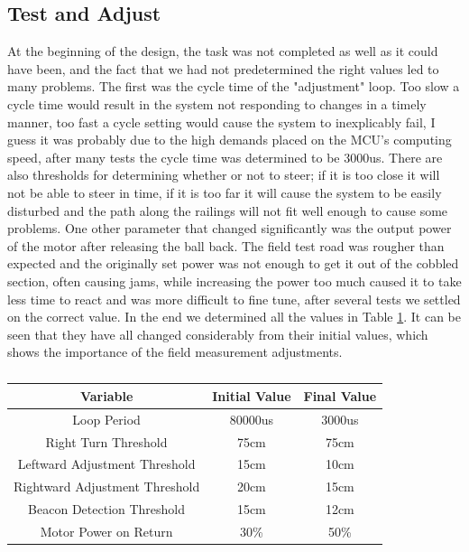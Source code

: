 \documentclass[12pt, a4paper, oneside]{report}
\begin{document}
\subsection{Test and Adjust}
At the beginning of the design, the task was not completed as well as it could have been, and the fact that we had not predetermined the right values led to many problems. The first was the cycle time of the "adjustment" loop. Too slow a cycle time would result in the system not responding to changes in a timely manner, too fast a cycle setting would cause the system to inexplicably fail, I guess it was probably due to the high demands placed on the MCU's computing speed, after many tests the cycle time was determined to be 3000us. There are also thresholds for determining whether or not to steer; if it is too close it will not be able to steer in time, if it is too far it will cause the system to be easily disturbed and the path along the railings will not fit well enough to cause some problems. One other parameter that changed significantly was the output power of the motor after releasing the ball back. The field test road was rougher than expected and the originally set power was not enough to get it out of the cobbled section, often causing jams, while increasing the power too much caused it to take less time to react and was more difficult to fine tune, after several tests we settled on the correct value. In the end we determined all the values in Table \ref{table:patio2}. It can be seen that they have all changed considerably from their initial values, which shows the importance of the field measurement adjustments.
\begin{table}[H]
    \centering
    \begin{tabular}{|c|c|c|}
        \hline
        Variable  & Initial Value & Final Value  \\
        \hline
        Loop Period & 80000us & 3000us \\
        \hline
        Right Turn Threshold & 75cm & 75cm\\
        \hline
        Leftward Adjustment Threshold & 15cm & 10cm\\
        \hline
        Rightward Adjustment Threshold & 20cm & 15cm\\
        \hline
        Beacon Detection Threshold & 15cm &12cm\\
        \hline
        Motor Power on Return & 30\% & 50\%\\
        \hline
    \end{tabular}
    \caption{}
    \label{table:patio2}
\end{table}
\end{document}
